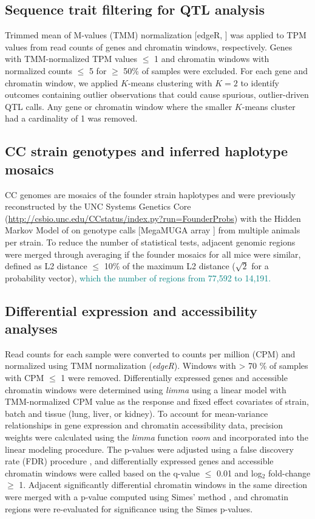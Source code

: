 \documentclass[9pt,twocolumn,twoside]{gsajnl}
\newcommand{\GKinline}[1]{\textcolor{teal}{#1}}
\begin{document}
\subsection{Sequence trait filtering for QTL analysis}

Trimmed mean of M-values (TMM) normalization [edgeR, \citep{edgeR}] was applied to TPM values from read counts of genes and chromatin windows, respectively. Genes with TMM-normalized TPM values $\leq$ 1 and chromatin windows with normalized counts $\leq$ 5 for $\geq$ 50\% of samples were excluded. For each gene and chromatin window, we applied $K$-means clustering with $K=2$ to identify outcomes containing outlier observations that could cause spurious, outlier-driven QTL calls. Any gene or chromatin window where the smaller $K$-means cluster had a cardinality of 1 was removed.

\subsection{CC strain genotypes and inferred haplotype mosaics}

CC genomes are mosaics of the founder strain haplotypes and were previously reconstructed by the UNC Systems Genetics Core (\url{http://csbio.unc.edu/CCstatus/index.py?run=FounderProbs}) with the Hidden Markov Model of \cite{Fu2012} on genotype calls [MegaMUGA array \citep{Morgan2016muga}] from multiple animals per strain. To reduce the number of statistical tests, adjacent genomic regions were merged through averaging if the founder mosaics for all mice were similar, defined as L2 distance $\leq$ 10\% of the maximum L2 distance ($\sqrt{2}$ for a probability vector), \GKinline{which the number of regions from 77,592 to 14,191.}

\subsection{Differential expression and accessibility analyses}

Read counts for each sample were converted to counts per million (CPM) and normalized using TMM normalization (\textit{edgeR}). Windows with > 70 \% of samples with CPM $\leq$ 1 were removed. Differentially expressed genes and accessible chromatin windows were determined using \textit{limma} \citep{limma} using a linear model with TMM-normalized CPM value as the response and fixed effect covariates of strain, batch and tissue (lung, liver, or kidney). 
To account for mean-variance relationships in gene expression and chromatin accessibility data, precision weights were calculated using the \textit{limma} function \textit{voom} and incorporated into the linear modeling procedure. The p-values were adjusted using a false discovery rate (FDR) procedure \citep{Benjamini1995}, and differentially expressed genes and accessible chromatin windows were called based on the q-value $\le$ 0.01 and log$_{2}$ fold-change $\geq$ 1. Adjacent significantly differential chromatin windows in the same direction were merged with a p-value computed using Simes' method \citep{Sarkar1997}, and chromatin regions were re-evaluated for significance using the Simes p-values.
\end{document}
